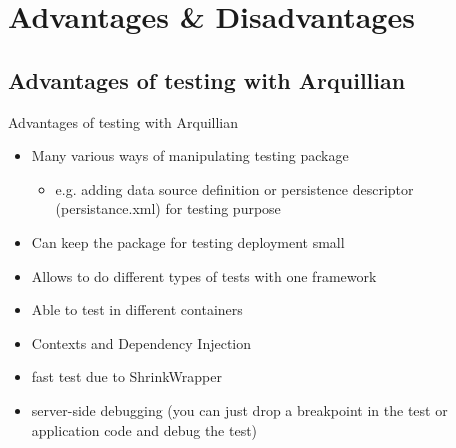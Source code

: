 \section[Advantages \& Disadvantages]{Advantages \& Disadvantages}
\subsection{Advantages of testing with Arquillian}
\begin{frame}{Advantages of testing with Arquillian}
  \begin{itemize}
  \item Many various ways of manipulating testing package
  		\begin{itemize}
  			\item e.g. adding data source definition or persistence descriptor (persistance.xml) for testing purpose
  		\end{itemize}
  \item Can keep the package for testing deployment small
  \item Allows to do different types of tests with one framework
  \item Able to test in different containers
  \item Contexts and Dependency Injection 
  \item fast test due to ShrinkWrapper
  \item server-side debugging (you can just drop a breakpoint in the test or 			application code and debug the test)
  \end{itemize}
\end{frame}

